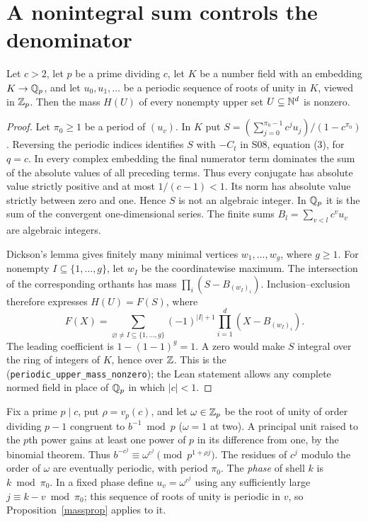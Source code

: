 \documentclass[11pt]{article}
\begin{document}
\section{A nonintegral sum controls the denominator}\label{mass}
\begin{proposition}\label{massprop}
Let \(c>2\), let \(p\) be a prime dividing \(c\), let \(K\) be a number
field with an embedding \(K\to\mathbb Q_p\), and let \(u_0,u_1,\ldots\) be a
periodic sequence of roots of unity in \(K\), viewed in \(\mathbb Z_p\). Then
the mass \(H(U)\) of every nonempty upper set \(U\subseteq\mathbb N^d\) is
nonzero. 
\end{proposition}
\begin{proof}
Let \(\pi_0\ge1\) be a period of \((u_v)\). In \(K\) put
\(S=(\sum_{j=0}^{\pi_0-1}c^ju_j)/(1-c^{\pi_0})\). Reversing the periodic indices identifies
\(S\) with \(-C_t\) in S08, equation (3), for \(q=c\).
In every complex embedding the final numerator term dominates the sum
of the absolute values of all preceding terms. Thus every conjugate
has absolute value strictly positive and at most \(1/(c-1)<1\).
Its norm has absolute value strictly between zero and one. Hence \(S\)
is not an algebraic integer. In \(\mathbb Q_p\) it is the sum of the convergent
one-dimensional series. The finite sums \(B_l=\sum_{v<l}c^vu_v\) are
algebraic integers.

Dickson's lemma gives finitely many minimal vertices \(w_1,\ldots,w_g\),
where \(g\ge1\). For nonempty \(I\subseteq\{1,\ldots,g\}\), let \(w_I\)
be the coordinatewise maximum. The intersection of the corresponding
orthants has mass \(\prod_i(S-B_{(w_I)_i})\).
Inclusion--exclusion therefore expresses \(H(U)=F(S)\), where
\[
 F(X)=\sum_{\varnothing\ne I\subseteq\{1,\ldots,g\}}(-1)^{|I|+1}
                 \prod_{i=1}^d(X-B_{(w_I)_i}).
\]
The leading coefficient is \(1-(1-1)^g=1\). A zero would make \(S\)
integral over the ring of integers of \(K\), hence over \(\mathbb Z\).
This is the 
(\texttt{periodic\_upper\_mass\_nonzero}); the Lean statement allows any
complete normed field in place of \(\mathbb Q_p\) in which \(|c|<1\).
\end{proof}

Fix a prime \(p\mid c\), put \(\rho=v_p(c)\), and let \(\omega\in\mathbb Z_p\) be the
root of unity of order dividing \(p-1\) congruent to \(b^{-1}\bmod p\)
(\(\omega=1\) at two). A principal unit raised to the \(p\)th power gains
at least one power of \(p\) in its difference from one, by the binomial
theorem. Thus \(b^{-c^j}\equiv\omega^{c^j}\pmod {p^{1+\rho j}}\).
The residues of \(c^j\) modulo the order of \(\omega\) are eventually
periodic, with period \(\pi_0\). The \emph{phase} of shell \(k\) is
\(k\bmod\pi_0\). In a fixed phase define \(u_v=\omega^{c^j}\) using any
sufficiently large \(j\equiv k-v\bmod\pi_0\); this sequence of roots of
unity is periodic in \(v\), so Proposition~\ref{massprop} applies to it.
\end{document}
